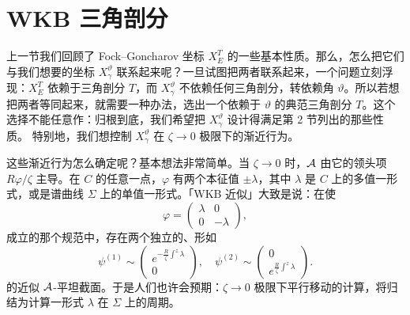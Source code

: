 
\section{WKB 三角剖分}
\label{sec:WKB-triangulation}

上一节我们回顾了 Fock–Goncharov 坐标 $X^T_E$ 的一些基本性质。那么，怎么把它们与我们想要的坐标 $X^\vartheta_\gamma$ 联系起来呢？一旦试图把两者联系起来，一个问题立刻浮现：$X^T_E$ 依赖于三角剖分 $T$，而 $X^\vartheta_\gamma$ 不依赖任何三角剖分，转依赖角 $\vartheta$。所以若想把两者等同起来，就需要一种办法，选出一个依赖于 $\vartheta$ 的典范三角剖分 $T$。这个选择不能任意作：归根到底，我们希望把 $X^\vartheta_\gamma$ 设计得满足第 2 节列出的那些性质。%
特别地，我们想控制 $X^\vartheta_\gamma$ 在 $\zeta \to 0$ 极限下的渐近行为。

这些渐近行为怎么确定呢？基本想法非常简单。当 $\zeta\to0$ 时，$\mathcal{A}$ 由它的领头项 $R\varphi/\zeta$ 主导。在 $C$ 的任意一点，$\varphi$ 有两个本征值 $\pm\lambda$，其中 $\lambda$ 是 $C$ 上的多值一形式，或是谱曲线 $\Sigma$ 上的单值一形式。「WKB 近似」大致是说：在使
\begin{equation}
\varphi = \begin{pmatrix} \lambda & 0 \\ 0 & -\lambda \end{pmatrix},
\end{equation}
成立的那个规范中，存在两个独立的、形如
\begin{equation} \label{eq:wkb-rough}
\psi^{(1)} \sim \begin{pmatrix} e^{- \frac{R}{\zeta} \int^z \lambda } \\ 0 \end{pmatrix}, \quad \psi^{(2)} \sim \begin{pmatrix} 0 \\ e^{\frac{R}{\zeta} \int^z \lambda } \end{pmatrix}.
\end{equation}
的近似 $\mathcal{A}$-平坦截面。于是人们也许会预期：$\zeta\to0$ 极限下平行移动的计算，将归结为计算一形式 $\lambda$ 在 $\Sigma$ 上的周期。

